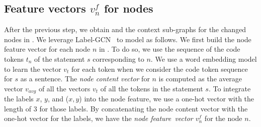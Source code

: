 \subsection{Feature vectors $v^{f}_n$ for {\mvpdgxy} nodes}
\label{feature:sec}

After the previous step, we obtain {\mvpdgxy} and the context
sub-graphs for the changed nodes in {\mvpdgxy}. We leverage
Label-GCN~\cite{label-gcn} to model {\mvpdgxy} as follows. We first
build the node feature vector for each node $n$ in {\mvpdgxy}. To do
so, we use the sequence of the code tokens $t_n$ of the statement $s$
corresponding to $n$. We use a word embedding
model to learn the vector $v_t$ for each token when we consider the
code token sequence for $s$ as a sentence. The {\em node content
  vector} for $n$ is computed as the average vector $v_{avg}$ of
all the vectors $v_t$ of all the tokens in the statement $s$.
%
To integrate the labels $x$, $y$, and ($x,y$) into the node feature,
we use a one-hot vector with the length of 3 for those labels. By
concatenating the node content vector with the one-hot vector for the
labels, we have the {\em node feature~vector $v^{f}_n$} for the node
$n$. 




